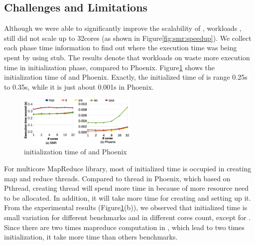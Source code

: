 \subsection{ Challenges and Limitations}
Although we were able to significantly improve the scalability of \myds, 
workloads ,  still did not scale up to 32cores (as shown in Figure\ref{fig:smr:speedup}). 
We collect each phase time information to find out where the execution time was being spent by using stub. 
The results denote that workloads on \myds waste more execution time in initialization phase, compared to Phoenix.
Figure\ref{fig:env:init} shows the initialization time of \myds and Phoenix.
Exactly, the initialized time of \myds is range 0.25s to 0.35s, while it is just about 0.001s in Phoenix.
\begin{figure}[!h!t]  
	\centering
	\includegraphics[width=0.5\textwidth]{eps/env_init.eps}
	\caption{initialization time of \myds and Phoenix}
	\label{fig:env:init}
\end{figure}


For multicore MapReduce library, most of initialized time is occupied in creating map and reduce threads.
Compared to thread in Phoenix, which based on Pthread, creating thread will spend more time in \myds because of more resource need to be allocated.
In addition, it will take more time for creating  and setting up it.
From the experimental results (Figure\ref{fig:env:init}(b)), we observed that initialized time is small variation for different benchmarks and in different cores count, except for .
Since there are two times mapreduce computation in , which lead to two times initialization, it take more time than others benchmarks.
  

